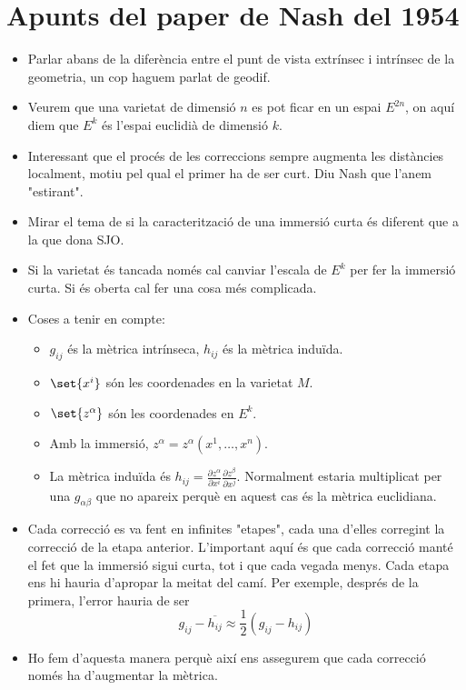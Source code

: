 \section{Apunts del paper de Nash del 1954}
{
\color{blue}
\begin{itemize}
    \item Parlar abans de la diferència entre el punt de vista extrínsec i intrínsec de la geometria, un cop haguem parlat de geodif. 
    \item Veurem que una varietat de dimensió $n$ es pot ficar en un espai $E^{2n}$, on aquí diem que $E^k$ és l'espai euclidià de dimensió $k$.
    \item Interessant que el procés de les correccions sempre augmenta les distàncies localment, motiu pel qual el primer ha de ser curt. Diu Nash que l'anem "estirant".
    \item Mirar el tema de si la caracterització de una immersió curta és diferent que a la que dona SJO.
    \item Si la varietat és tancada només cal canviar l'escala de $E^k$ per fer la immersió curta. Si és oberta cal fer una cosa més complicada.
    \item Coses a tenir en compte:
        \begin{itemize}
            \item $g_{ij}$ és la mètrica intrínseca, $h_{ij}$ és la mètrica induïda.
            \item $\set{x^i}$ són les coordenades en la varietat $M$.
            \item $\set{z^\alpha}$ són les coordenades en $E^k$.
            \item Amb la immersió, $z^\alpha = z^\alpha(x^1, \dots, x^n)$.
            \item La mètrica induïda és $h_{ij} = \frac{\partial z^\alpha}{\partial x^i}\frac{\partial z^\beta}{\partial x^j}$. Normalment estaria multiplicat per una $g_{\alpha\beta}$ que no apareix perquè en aquest cas és la mètrica euclidiana.
        \end{itemize}
    \item Cada correcció es va fent en infinites "etapes", cada una d'elles corregint la correcció de la etapa anterior. L'important aquí és que cada correcció manté el fet que la immersió sigui curta, tot i que cada vegada menys. Cada etapa ens hi hauria d'apropar la meitat del camí. Per exemple, després de la primera, l'error hauria de ser
    $$g_{ij}-\overline{h_{ij}}\approx \frac12(g_{ij}-h_{ij})$$
    \item Ho fem d'aquesta manera perquè així ens assegurem que cada correcció només ha d'augmentar la mètrica. 

\end{itemize}}
